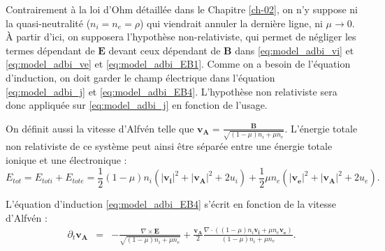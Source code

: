 Contrairement à la loi d'Ohm détaillée dans le Chapitre \ref{ch-02}, on n'y suppose ni la quasi-neutralité ($n_i = n_e = \rho$) qui viendrait annuler la dernière ligne, ni $\mu \rightarrow 0$. À partir d'ici, on supposera l'hypothèse non-relativiste, qui permet de négliger les termes dépendant de $\boldsymbol{E}$ devant ceux dépendant de $\boldsymbol{B}$ dans \eqref{eq:model_adbi_vi} et \eqref{eq:model_adbi_ve} et \eqref{eq:model_adbi_EB1}. Comme on a besoin de l'équation d'induction, on doit garder le champ électrique dans l'équation \eqref{eq:model_adbi_j} et  \eqref{eq:model_adbi_EB4}. L'hypothèse non relativiste sera donc appliquée sur \eqref{eq:model_adbi_j} en fonction de l'usage.

On définit aussi la vitesse d'Alfvén telle que $\boldsymbol{v_A} = \frac{\boldsymbol{B}}{\sqrt{(1-\mu) n_i + \mu n_e}}$. L'énergie totale non relativiste de ce système peut ainsi être séparée entre une énergie totale ionique et une électronique : 
\begin{equation*}
E_{tot} = E_{toti} + E_{tote} =  \frac{1}{2} (1-\mu) n_i (|\boldsymbol{v_i}|^2 + |\boldsymbol{v_A}|^2 + 2 u_i) + \frac{1}{2} \mu n_e (|\boldsymbol{v_e}|^2 + |\boldsymbol{v_A}|^2 + 2 u_e).
\end{equation*}

L'équation d'induction \eqref{eq:model_adbi_EB4} s'écrit en fonction de la vitesse d'Alfvén : 
\begin{eqnarray}
\label{eq:model_adbi_B}  \partial_t \boldsymbol{v_A} &=& - \frac{\nabla \times  \boldsymbol{E}}{\sqrt{(1-\mu) n_i + \mu n_e}} + \frac{\boldsymbol{v_{A}}}{2}\frac{\nabla \cdot ((1-\mu) n_i \boldsymbol{v_i}+\mu n_e \boldsymbol{v_e})}{(1-\mu) n_i + \mu n_e}  .
\end{eqnarray}


